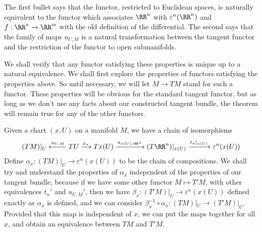 %
The first bullet says that the functor, restricted to Euclidean spaces, is naturally equivalent to the functor which associates $\RR^n$ with $\varepsilon^n(\RR^n)$ and $f: \RR^n \to \RR^m$ with the old definition of the differential. The second says that the family of maps $u_{U,M}$ is a natural transformation between the tangent functor and the restriction of the functor to open submanifolds.

We shall verify that any functor satisfying these properties is unique up to a natural equivalence. We shall first explore the properties of functors satisfying the properties above. So until necessary, we will let $M \to TM$ stand for such a functor. These properties will be obvious for the standard tangent functor, but as long as we don't use any facts about our constructed tangent bundle, the theorem will remain true for any of the other functors.

Given a chart $(x,U)$ on a manifold $M$, we have a chain of isomorphisms
%
\[ (TM)|_U \xleftarrow{u_{U,M}} TU \xrightarrow{x_*} Tx(U) \xrightarrow{u_{x(U), \RR^n}} (T\RR^n)|_{x(U)} \xrightarrow{t_n|_{x(U)}} \varepsilon^n(x(U)) \]
%
Define $\alpha_x: (TM)|_U \to \varepsilon^n(x(U))$ to be the chain of compositions. We shall try and understand the properties of $\alpha_x$ independent of the properties of our tangent bundle, because if we have some other functor $M \mapsto T'M$, with other equivalences $t_n'$ and $u_{U,M}'$, then we have $\beta_x: (T'M)|_U \to \varepsilon^n(x(U))$ defined exactly as $\alpha_x$ is defined, and we can consider $\beta_x^{-1} \circ \alpha_x: (TM)|_U \to (T'M)|_U$. Provided that this map is independent of $x$, we can put the maps together for all $x$, and obtain an equivalence between $TM$ and $T'M$.

